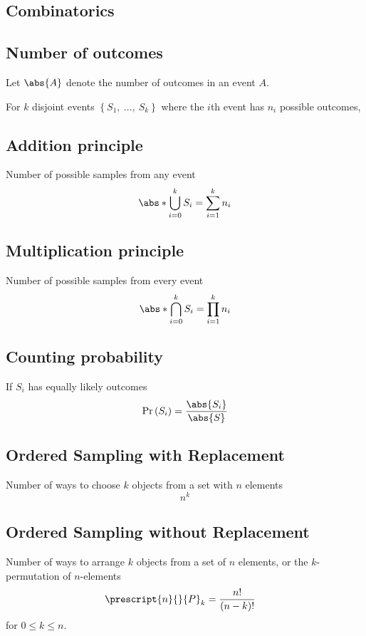 \documentclass{article}
\begin{document}
\begin{multicols}{3}
    \section{Combinatorics}
    \subsection{Number of outcomes}
    Let \(\abs{A}\) denote the number of outcomes in an event \(A\).
    
    For \(k\) disjoint events \({\left\{ S_1,\:\ldots,\:S_k \right\}}\)
    where the \(i\)th event has \(n_i\) possible outcomes,
    \subsection{Addition principle}
        Number of possible samples from any event
        \begin{equation*}
            \abs*{\bigcup_{i = 0}^{k} S_i} = \sum_{i = 1}^k n_i
        \end{equation*}
    \subsection{Multiplication principle}
        Number of possible samples from every event
        \begin{equation*}
            \abs*{\bigcap_{i=0}^{k} S_i} = \prod_{i = 1}^k n_i
        \end{equation*}
    \subsection{Counting probability}
        If \(S_i\) has equally likely outcomes
        \begin{equation*}
            \Pr{\left( S_i \right)} = \frac{\abs{S_i}}{\abs{S}}
        \end{equation*}
    \subsection{Ordered Sampling with Replacement}
    Number of ways to choose \(k\) objects from a set with \(n\) elements
    \begin{equation*}
        n^k
    \end{equation*}
    \subsection{Ordered Sampling without Replacement}
    Number of ways to arrange \(k\) objects from a set of \(n\) elements,
    or the \(k\)-permutation of \(n\)-elements
    \begin{align*}
        \prescript{n}{}{P}_k & = \frac{n!}{\left( n - k \right)!}
    \end{align*}
    for \(0 \leq k \leq n\).
    

\end{multicols}
\end{document}
